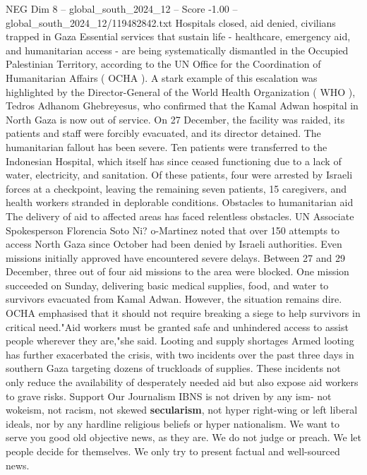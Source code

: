 \begin{textsample}{NEG Dim 8 – global\_south\_2024\_12 – Score -1.00 – global\_south\_2024\_12/119482842.txt}  \label{ex:f8_neg_108}
Hospitals closed, aid denied, civilians trapped in Gaza Essential services that sustain life - healthcare, emergency aid, and humanitarian access - are being systematically dismantled in the Occupied Palestinian Territory, according to the UN Office for the Coordination of Humanitarian Affairs ( OCHA ).
A stark example of this escalation was highlighted by the Director-General of the World Health Organization ( WHO ), Tedros Adhanom Ghebreyesus, who confirmed that the Kamal Adwan hospital in North Gaza is now out of service.
On 27 December, the facility was raided, its patients and staff were forcibly evacuated, and its director detained.
The humanitarian fallout has been severe.
Ten patients were transferred to the Indonesian Hospital, which itself has since ceased functioning due to a lack of water, electricity, and sanitation.
Of these patients, four were arrested by Israeli forces at a checkpoint, leaving the remaining seven patients, 15 caregivers, and health workers stranded in deplorable conditions.
Obstacles to humanitarian aid The delivery of aid to affected areas has faced relentless obstacles.
UN Associate Spokesperson Florencia Soto Ni? o-Martinez noted that over 150 attempts to access North Gaza since October had been denied by Israeli authorities.
Even missions initially approved have encountered severe delays.
Between 27 and 29 December, three out of four aid missions to the area were blocked.
One mission succeeded on Sunday, delivering basic medical supplies, food, and water to survivors evacuated from Kamal Adwan.
However, the situation remains dire.
OCHA emphasised that it should not require breaking a siege to help survivors in critical need."Aid workers must be granted safe and unhindered access to assist people wherever they are,"she said.
Looting and supply shortages Armed looting has further exacerbated the crisis, with two incidents over the past three days in southern Gaza targeting dozens of truckloads of supplies.
These incidents not only reduce the availability of desperately needed aid but also expose aid workers to grave risks.
Support Our Journalism IBNS is not driven by any ism- not wokeism, not racism, not skewed \textbf{secularism}, not hyper right-wing or left liberal ideals, nor by any hardline religious beliefs or hyper nationalism.
We want to serve you good old objective news, as they are.
We do not judge or preach.
We let people decide for themselves.
We only try to present factual and well-sourced news.

\end{textsample}
